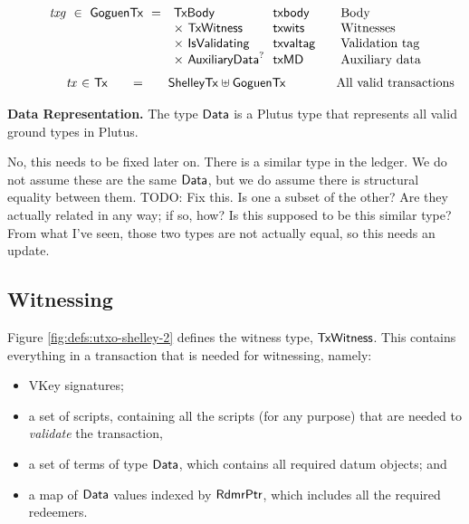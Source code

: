 \begin{figure*}[htb]
\begin{equation*}
\begin{array}{r@{~~}l@{~~}l@{\qquad}l}
      \var{txg} ~\in~ \GoguenTx ~=~
      & \TxBody & \fun{txbody} & \text{Body}\\
      & \times ~\TxWitness & \fun{txwits} & \text{Witnesses}\\
      & \times ~\IsValidating & \fun{txvaltag}&\text{Validation tag}\\
      & \times ~\AuxiliaryData^? & \fun{txMD}&\text{Auxiliary data}\\
    \end{array}
  \end{equation*}
  \begin{equation*}
    \begin{array}{r@{~\in~}l@{\qquad=\qquad}l@{\qquad\qquad}l}
\qquad\qquad      \var{tx} & \Tx & \ShelleyTx \uniondistinct \GoguenTx &
      \text{All valid transactions}\\
    \end{array}
  \end{equation*}
  \caption{Definitions for transactions, cont.}
  \label{fig:defs:utxo-shelley-2}
\end{figure*}


\textbf{Data Representation.}
The type $\mathsf{Data}$ is a Plutus type that represents all valid ground types in Plutus.
\begin{note}
  No, this needs to be fixed later on.
There is a similar type in the
ledger. We do not assume these are the same $\mathsf{Data}$, but we do assume there
is structural equality between them. TODO: {Fix this.  Is one a subset of the other?  Are they actually related in any way; if so, how?}
  Is this supposed to be this similar type? From what I've seen, those
  two types are not actually equal, so this needs an update.
\end{note}

\subsection{Witnessing}
Figure \ref{fig:defs:utxo-shelley-2} defines the witness type, $\mathsf{TxWitness}$.  This contains everything
in a transaction that is needed for witnessing, namely:

\begin{itemize}
  \item VKey signatures;
  \item a set of scripts, containing all the scripts (for any purpose) that are needed to \emph{validate} the transaction,
  \item a set of terms of type $\mathsf{Data}$, which contains all required datum objects; and
  \item a map of $\mathsf{Data}$ values indexed by $\mathsf{RdmrPtr}$, which includes all the
  required redeemers.
\end{itemize}

